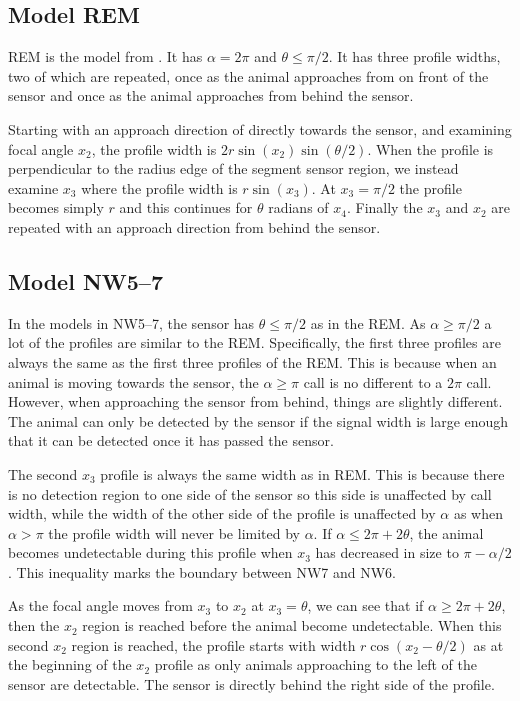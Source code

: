\subsection{Model REM} \label{REM}

REM is the model from \citep{rowcliffe2008estimating}. It has $\alpha =2\pi$ and $\theta \le \pi/2$. It has three profile widths, two of which are repeated, once as the animal approaches from on front of the sensor and once as the animal approaches from behind the sensor.

Starting with an approach direction of directly towards the sensor, and examining focal angle $x_2$, the profile width is $2r\sin(x_2)\sin(\theta/2)$. When the profile is perpendicular to the radius edge of the segment sensor region, we instead examine $x_3$ where the profile width is $r\sin(x_3)$. At $x_3=\pi/2$ the profile becomes simply $r$ and this continues for $\theta $ radians of $x_4$. Finally the $x_3$ and $x_2$ are repeated with an approach direction from behind the sensor. 



\subsection{Model NW5--7} \label{NW57}

In the models in NW5--7, the sensor has $\theta \le \pi/2$ as in the REM. As $\alpha \ge \pi/2$ a lot of the profiles are similar to the REM. Specifically, the first three profiles are always the same as the first three profiles of the REM. This is because when an animal is moving towards the sensor, the $\alpha \ge \pi$ call is no different to a $2\pi$ call. However, when approaching the sensor from behind, things are slightly different. The animal can only be detected by the sensor if the signal width is large enough that it can be detected once it has passed the sensor. 

The second $x_3$ profile is always the same width as in REM. This is because there is no detection region to one side of the sensor so this side is unaffected by call width, while the width of the other side of the profile is unaffected by $\alpha$ as when $\alpha>\pi$ the profile width will never be limited by $\alpha$. If $\alpha \le 2\pi + 2\theta$, the animal becomes undetectable during this profile when  $x_3$ has decreased in size to $\pi - \alpha/2$. This inequality marks the boundary between NW7 and NW6. 

As the focal angle moves from $x_3$ to $x_2$  at $x_3=\theta$, we can see that if $\alpha \ge 2\pi + 2\theta$, then the $x_2$ region is reached before the animal become undetectable. When this second $x_2$ region is reached, the profile starts with width $r\cos(x_2 - \theta/2)$ as at the beginning of the $x_2$ profile as only animals approaching to the left of the sensor are detectable. The sensor is directly behind the right side of the profile.

